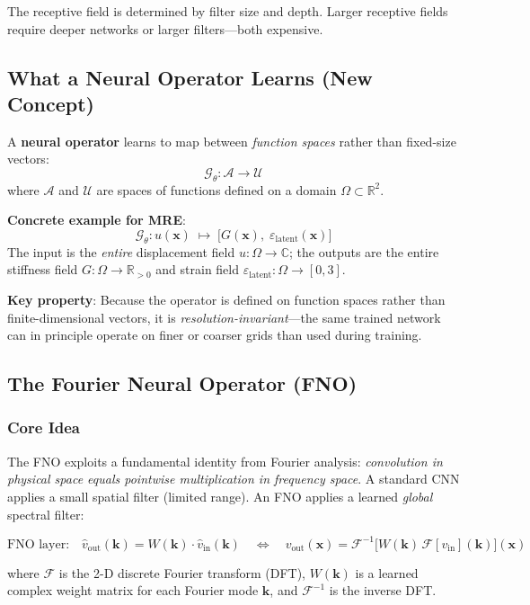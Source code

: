 \documentclass[11pt,letterpaper]{article}
\newcommand{\R}{\mathbb{R}}
\newcommand{\C}{\mathbb{C}}
\newcommand{\FT}{\mathcal{F}}
\newcommand{\IFT}{\mathcal{F}^{-1}}
\newcommand{\xvec}{\bm{x}}
\newcommand{\kvec}{\bm{k}}
\newcommand{\eps}{\varepsilon_{\mathrm{latent}}}
\begin{document}
The receptive field is determined by filter size and depth. Larger receptive fields
require deeper networks or larger filters---both expensive.

\subsection{What a Neural Operator Learns (New Concept)}

A \textbf{neural operator} learns to map between \emph{function spaces} rather than
fixed-size vectors:
\[
    \mathcal{G}_\theta : \mathcal{A} \to \mathcal{U}
\]
where $\mathcal{A}$ and $\mathcal{U}$ are spaces of functions defined on a domain
$\Omega \subset \R^2$.

\textbf{Concrete example for MRE}:
\[
    \mathcal{G}_\theta : u(\xvec) \;\longmapsto\; \bigl[G(\xvec),\; \eps(\xvec)\bigr]
\]
The input is the \emph{entire} displacement field $u : \Omega \to \C$; the outputs are
the entire stiffness field $G : \Omega \to \R_{>0}$ and strain field
$\eps : \Omega \to [0,3]$.

\textbf{Key property}: Because the operator is defined on function spaces rather than
finite-dimensional vectors, it is \emph{resolution-invariant}---the same trained
network can in principle operate on finer or coarser grids than used during training.

\subsection{The Fourier Neural Operator (FNO)}

\subsubsection{Core Idea}

The FNO exploits a fundamental identity from Fourier analysis: \emph{convolution in
physical space equals pointwise multiplication in frequency space}. A standard CNN
applies a small spatial filter (limited range). An FNO applies a learned
\emph{global} spectral filter:

\[
    \text{FNO layer:} \quad
    \hat{v}_{\text{out}}(\kvec) = W(\kvec) \cdot \hat{v}_{\text{in}}(\kvec)
    \quad \Leftrightarrow \quad
    v_{\text{out}}(\xvec) = \IFT\bigl[W(\kvec)\,\FT[v_{\text{in}}](\kvec)\bigr](\xvec)
\]

where $\FT$ is the 2-D discrete Fourier transform (DFT), $W(\kvec)$ is a learned
complex weight matrix for each Fourier mode $\kvec$, and $\IFT$ is the inverse DFT.
\end{document}
